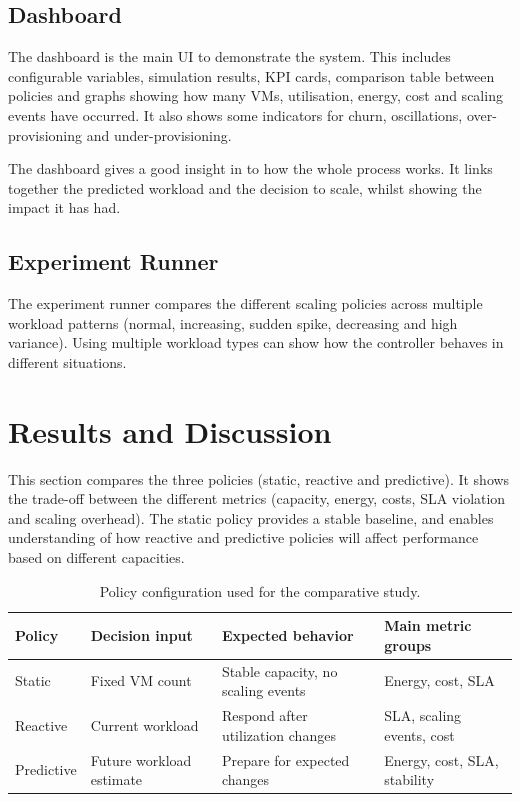 \documentclass[10pt,journal,compsoc]{IEEEtran}
\begin{document}
\subsection{Dashboard}
The dashboard is the main UI to demonstrate the system. This includes configurable variables, simulation results, KPI cards, comparison table between policies and graphs showing how many VMs, utilisation, energy, cost and scaling events have occurred. It also shows some indicators for churn, oscillations, over-provisioning and under-provisioning.

The dashboard gives a good insight in to how the whole process works. It links together the predicted workload and the decision to scale, whilst showing the impact it has had.

\subsection{Experiment Runner}
The experiment runner compares the different scaling policies across multiple workload patterns (normal, increasing, sudden spike, decreasing and high variance). Using multiple workload types can show how the controller behaves in different situations.

\section{Results and Discussion}
This section compares the three policies (static, reactive and predictive). It shows the trade-off between the different metrics (capacity, energy, costs, SLA violation and scaling overhead). The static policy provides a stable baseline, and enables understanding of how reactive and predictive policies will affect performance based on different capacities.

\begin{table}[htbp]
\caption{Policy configuration used for the comparative study.}
\centering
\begin{tabular}{|p{1.4cm}|p{1.6cm}|p{2.3cm}|p{1.9cm}|}
\hline
\textbf{Policy} & \textbf{Decision input} & \textbf{Expected behavior} & \textbf{Main metric groups} \\ \hline
Static & Fixed VM count & Stable capacity, no scaling events & Energy, cost, SLA \\ \hline
Reactive & Current workload & Respond after utilization changes & SLA, scaling events, cost \\ \hline
Predictive & Future workload estimate & Prepare for expected changes & Energy, cost, SLA, stability \\ \hline
\end{tabular}
\label{tab:policy_config}
\end{table}
\end{document}
